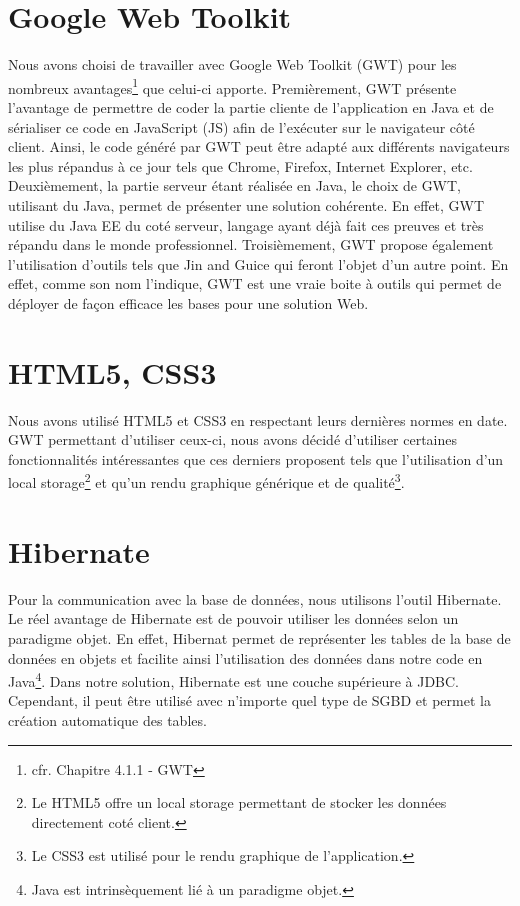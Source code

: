 \section{Google Web Toolkit}

Nous avons choisi de travailler avec Google Web Toolkit (GWT) pour les nombreux avantages\footnote{cfr. Chapitre 4.1.1 - GWT} que celui-ci apporte. 
\newline
\indent
Premièrement,  GWT présente l'avantage de permettre de coder la partie cliente de l'application en Java et de sérialiser ce code en JavaScript (JS) afin de l'exécuter sur le navigateur côté client. Ainsi, le code généré par GWT peut être adapté aux différents navigateurs les plus répandus à ce jour tels que Chrome, Firefox, Internet Explorer, etc.
\newline
\indent
Deuxièmement, la partie serveur étant réalisée en Java, le choix de GWT, utilisant du Java, permet de présenter une solution cohérente. En effet, GWT utilise du Java EE du coté serveur, langage ayant déjà fait ces preuves et très répandu dans le monde professionnel.
\newline
\indent
Troisièmement, GWT propose également l'utilisation d'outils tels que Jin and Guice qui feront l'objet d'un autre point. En effet, comme son nom l'indique, GWT est une vraie boite à outils qui permet de déployer de façon efficace les bases pour une solution Web.


\section{HTML5, CSS3}
Nous avons utilisé HTML5 et CSS3 en respectant leurs dernières normes en date. GWT permettant d'utiliser ceux-ci, nous avons décidé d'utiliser certaines fonctionnalités intéressantes que ces derniers proposent tels que l'utilisation d'un local storage\footnote{Le HTML5 offre un local storage permettant de stocker les données directement coté client.} et qu'un rendu graphique générique et de qualité\footnote{Le CSS3 est utilisé pour le rendu graphique de l'application.}.

\section{Hibernate}
Pour la communication avec la base de données, nous utilisons l'outil Hibernate. Le réel avantage de Hibernate est de pouvoir utiliser les données selon un paradigme objet. 
\newline
\indent
En effet, Hibernat permet de représenter les tables de la base de données en objets et facilite ainsi l'utilisation des données dans notre code en Java\footnote{Java est intrinsèquement lié à un paradigme objet.}.
\newline
\indent
Dans notre solution, Hibernate est une couche supérieure à JDBC. Cependant, il peut être utilisé avec n'importe quel type de SGBD et permet la création automatique des tables. 

